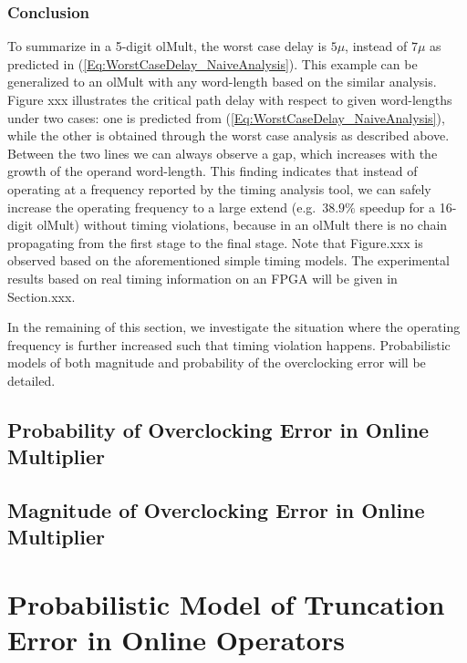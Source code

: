 \documentclass[a4paper, 11pt]{article}
\begin{document}
\subsubsection{Conclusion}
To summarize in a 5-digit olMult, the worst case delay is $5\mu$, instead of $7\mu$ as predicted in (\ref{Eq:WorstCaseDelay_NaiveAnalysis}). This example can be generalized to an olMult with any word-length based on the similar analysis. Figure xxx illustrates the critical path delay with respect to given word-lengths under two cases: one is predicted from (\ref{Eq:WorstCaseDelay_NaiveAnalysis}), while the other is obtained through the worst case analysis as described above. Between the two lines we can always observe a gap, which increases with the growth of the operand word-length. This finding indicates that instead of operating at a frequency reported by the timing analysis tool, we can safely increase the operating frequency to a large extend (e.g.~$38.9\%$ speedup for a 16-digit olMult) without timing violations, because in an olMult there is no chain propagating from the first stage to the final stage. Note that Figure.xxx is observed based on the aforementioned simple timing models. The experimental results based on real timing information on an FPGA will be given in Section.xxx.

In the remaining of this section, we investigate the situation where the operating frequency is further increased such that timing violation happens. Probabilistic models of both magnitude and probability of the overclocking error will be detailed.




\subsection{Probability of Overclocking Error in Online Multiplier}

\subsection{Magnitude of Overclocking Error in Online Multiplier}

\section{Probabilistic Model of Truncation Error in Online Operators}
\end{document}
